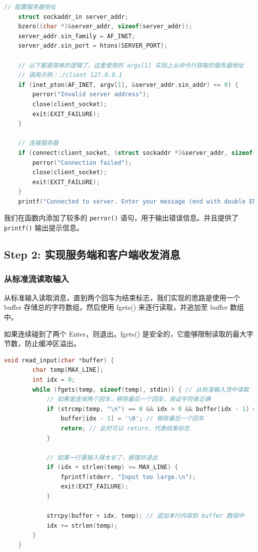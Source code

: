 \documentclass[14pt,a4paper,UTF8,twoside]{article}
\begin{document}
\begin{lstlisting}[language=C, title={Connect to Server}]
    // 配置服务器地址
    struct sockaddr_in server_addr;
    bzero((char *)&server_addr, sizeof(server_addr));
    server_addr.sin_family = AF_INET;
    server_addr.sin_port = htons(SERVER_PORT);

    // 以下都是简单的逻辑了，这里使用的 argv[1] 实际上从命令行获取的服务器地址
    // 调用示例：./client 127.0.0.1
    if (inet_pton(AF_INET, argv[1], &server_addr.sin_addr) <= 0) {
        perror("Invalid server address");
        close(client_socket);
        exit(EXIT_FAILURE);
    }

    // 连接服务器
    if (connect(client_socket, (struct sockaddr *)&server_addr, sizeof(server_addr)) < 0) {
        perror("Connection failed");
        close(client_socket);
        exit(EXIT_FAILURE);
    }
    printf("Connected to server. Enter your message (end with double ENTER):\n");
\end{lstlisting}

我们在函数内添加了较多的 \texttt{perror()} 语句，用于输出错误信息。并且提供了 \texttt{printf()} 输出提示信息。

\subsection{Step 2: 实现服务端和客户端收发消息}

\subsubsection*{从标准流读取输入}

从标准输入读取消息，直到两个回车为结束标志，我们实现的思路是使用一个 buffer 存储总的字符数组，然后使用 fgets() 来逐行读取，并追加至 buffer 数组中。

如果连续碰到了两个 Enter，则退出。fgets() 是安全的，它能够限制读取的最大字节数，防止缓冲区溢出。

\begin{lstlisting}[language=C, title={Read Input}]
    void read_input(char *buffer) {
        char temp[MAX_LINE];
        int idx = 0;
        while (fgets(temp, sizeof(temp), stdin)) { // 从标准输入流中读取
            // 如果是连续两个回车，移除最后一个回车，保证字符串正确
            if (strcmp(temp, "\n") == 0 && idx > 0 && buffer[idx - 1] == '\n') {
                buffer[idx - 1] = '\0'; // 移除最后一个回车
                return; // 此时可以 return，代表结束标志
            }
    
            // 如果一行里输入得太长了，报错并退出
            if (idx + strlen(temp) >= MAX_LINE) {
                fprintf(stderr, "Input too large.\n");
                exit(EXIT_FAILURE);
            }

            strcpy(buffer + idx, temp); // 追加本行内容到 buffer 数组中
            idx += strlen(temp);
        }
    }
\end{lstlisting}
\end{document}
